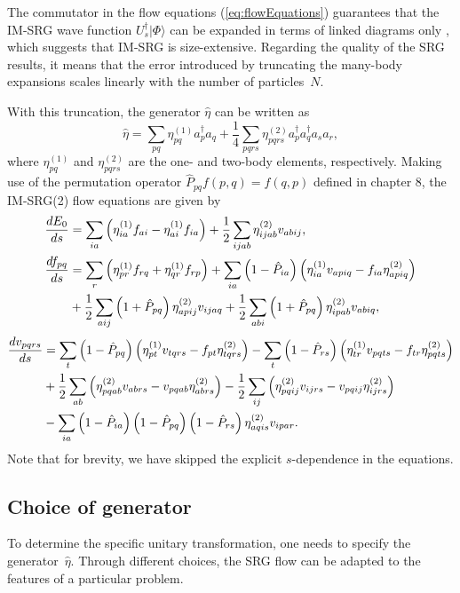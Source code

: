 The
commutator in the flow equations (\ref{eq:flowEquations}) guarantees
that the IM-SRG wave function $U_s^\dagger|\Phi\rangle$ can be
expanded in terms of linked diagrams only
\cite{Shavitt:2009,Hergert:2016jk,Hergert:2016ng}, which suggests that IM-SRG
is size-extensive. Regarding the quality of the SRG results, it means
that the error introduced by truncating the many-body expansions
scales linearly with the number of particles~$N$.

With this
truncation, the generator $\hat{\eta}$ can be written as
\[
\hat{\eta} = \sum_{pq} \eta_{pq}^{(1)} a_p^{\dagger}a_q  +
\frac{1}{4}\sum\limits_{pqrs}\eta_{pqrs}^{(2)} a_p^{\dagger}a_q^{\dagger}a_s
a_r,
\]
where $\eta_{pq}^{(1)}$ and $ \eta_{pqrs}^{(2)}$ are the one- and
two-body elements, respectively. Making use of the permutation
operator $ \hat{P}_{pq}f(p,q) = f(q,p)$ defined in chapter 8, the IM-SRG(2) flow equations
are given by
\begin{align}
\frac{d E_0}{ds} &= \sum_{ia}\left( \eta_{ia}^{(1)}f_{ai} -
\eta_{ai}^{(1)}f_{ia}\right) +
\frac{1}{2}\sum_{ijab}\eta_{ijab}^{(2)}v_{abij},
\label{eq:flow1}\\
\frac{d f_{pq}}{ds}&= \sum_r \left(\eta_{pr}^{(1)}f_{rq} +
\eta_{qr}^{(1)}f_{rp}\right) + \sum_{ia}\left(1-\hat{P}_{ia}\right)\left(
\eta_{ia}^{(1)}v_{apiq} - f_{ia}\eta_{apiq}^{(2)} \right)\notag \\ &
+\frac{1}{2} \sum_{aij} \left(1+\hat{P}_{pq}\right)
\eta_{apij}^{(2)}v_{ijaq} + \frac{1}{2}\sum_{abi}\left(1+\hat{P}_{pq}\right) \eta_{ipab}^{(2)}v_{abiq},
\label{eq:flow2}
\end{align}
\begin{align}
\frac{d v_{pqrs}}{ds} &= \sum_t \left(1-\hat{P}_{pq} \right)\left(
\eta_{pt}^{(1)}v_{tqrs}-f_{pt}\eta_{tqrs}^{(2)}\right)-\sum_t \left(
1-\hat{P}_{rs} \right)\left(\eta_{tr}^{(1)} v_{pqts} - f_{tr}
\eta_{pqts}^{(2)}\right)\notag \\ & +\frac{1}{2}\sum_{ab}
\left(\eta_{pqab}^{(2)} v_{abrs} - v_{pqab}\eta_{abrs}^{(2)}\right)-
\frac{1}{2}\sum_{ij} \left(\eta_{pqij}^{(2)} v_{ijrs} -
v_{pqij}\eta_{ijrs}^{(2)}\right)\notag \\ & -\sum_{ia} \left(1-
\hat{P}_{ia} \right)\left(1-\hat{P}_{pq}\right)\left(1-\hat{P}_{rs} \right)
\eta_{aqis}^{(2)}v_{ipar}.
\label{eq:flow3}
\end{align}
Note that for brevity, we have skipped the explicit $s$-dependence in the equations.

\subsection{Choice of generator}
To determine the specific unitary transformation, one needs to specify
the generator~$\hat{\eta}$. Through different choices, the SRG flow
can be adapted to the features of a particular problem.\\



